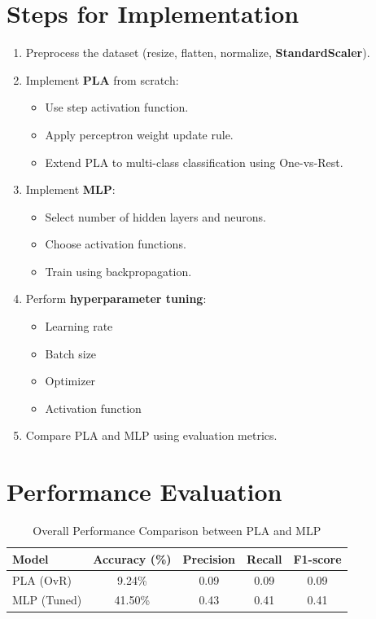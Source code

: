 \documentclass[11pt]{article}
\begin{document}
\section*{Steps for Implementation}

\begin{enumerate}[label=\arabic*.]
    \item Preprocess the dataset (resize, flatten, normalize, \textbf{StandardScaler}).
    \item Implement \textbf{PLA} from scratch:
    \begin{itemize}
        \item Use step activation function.
        \item Apply perceptron weight update rule.
        \item Extend PLA to multi-class classification using One-vs-Rest.
    \end{itemize}
    \item Implement \textbf{MLP}:
    \begin{itemize}
        \item Select number of hidden layers and neurons.
        \item Choose activation functions.
        \item Train using backpropagation.
    \end{itemize}
    \item Perform \textbf{hyperparameter tuning}:
    \begin{itemize}
        \item Learning rate
        \item Batch size
        \item Optimizer
        \item Activation function
    \end{itemize}
    \item Compare PLA and MLP using evaluation metrics.
\end{enumerate}

\section*{Performance Evaluation}

\begin{table}[h!]
\centering
\caption{Overall Performance Comparison between PLA and MLP}
\renewcommand{\arraystretch}{1.3}
\begin{tabular}{lcccc}
\toprule
\textbf{Model} & \textbf{Accuracy (\%)} & \textbf{Precision} & \textbf{Recall} & \textbf{F1-score} \\
\midrule
PLA (OvR) & 9.24\% & 0.09 & 0.09 & 0.09 \\
MLP (Tuned) & 41.50\% & 0.43 & 0.41 & 0.41 \\
\bottomrule
\end{tabular}
\end{table}
\end{document}

